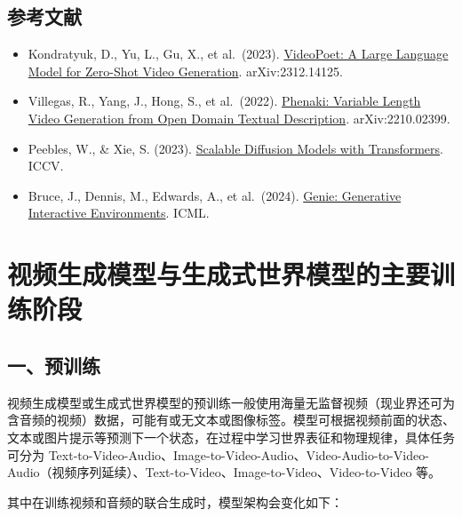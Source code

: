 \hypertarget{ux53c2ux8003ux6587ux732e-176}{%
\subsection{参考文献}\label{ux53c2ux8003ux6587ux732e-176}}

\begin{itemize}
\tightlist
\item
  Kondratyuk, D., Yu, L., Gu, X., et al.~(2023). \href{https://arxiv.org/abs/2312.14125}{VideoPoet: A Large Language Model for Zero-Shot Video Generation}. arXiv:2312.14125.
\item
  Villegas, R., Yang, J., Hong, S., et al.~(2022). \href{https://arxiv.org/abs/2210.02399}{Phenaki: Variable Length Video Generation from Open Domain Textual Description}. arXiv:2210.02399.
\item
  Peebles, W., \& Xie, S. (2023). \href{https://arxiv.org/abs/2212.09748}{Scalable Diffusion Models with Transformers}. ICCV.
\item
  Bruce, J., Dennis, M., Edwards, A., et al.~(2024). \href{https://arxiv.org/abs/2402.15391}{Genie: Generative Interactive Environments}. ICML.
\end{itemize}

\clearpage

\hypertarget{ux89c6ux9891ux751fux6210ux6a21ux578bux4e0eux751fux6210ux5f0fux4e16ux754cux6a21ux578bux7684ux4e3bux8981ux8badux7ec3ux9636ux6bb5}{%
\section{视频生成模型与生成式世界模型的主要训练阶段}\label{ux89c6ux9891ux751fux6210ux6a21ux578bux4e0eux751fux6210ux5f0fux4e16ux754cux6a21ux578bux7684ux4e3bux8981ux8badux7ec3ux9636ux6bb5}}

\hypertarget{ux4e00ux9884ux8badux7ec3}{%
\subsection{一、预训练}\label{ux4e00ux9884ux8badux7ec3}}

视频生成模型或生成式世界模型的预训练一般使用海量无监督视频（现业界还可为含音频的视频）数据，可能有或无文本或图像标签。模型可根据视频前面的状态、文本或图片提示等预测下一个状态，在过程中学习世界表征和物理规律，具体任务可分为 Text-to-Video-Audio、Image-to-Video-Audio、Video-Audio-to-Video-Audio（视频序列延续）、Text-to-Video、Image-to-Video、Video-to-Video 等。

其中在训练视频和音频的联合生成时，模型架构会变化如下：

